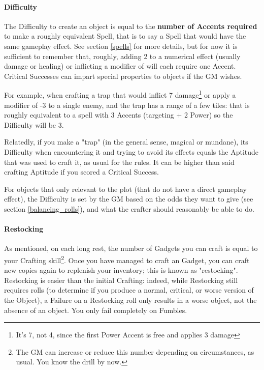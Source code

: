 \paragraph{Difficulty}

The Difficulty to create an object is equal to the \textbf{number of Accents required} to make a roughly equivalent Spell, that is to say a Spell that would have the same gameplay effect. See section \ref{spells} for more details, but for now it is sufficient to remember that, roughly, adding 2 to a numerical effect (usually damage or healing) or inflicting a modifier of  will each require one Accent. Critical Successes can impart special properties to objects if the GM wishes.

For example, when crafting a trap that would inflict 7 damage\footnote{It's 7, not 4, since the first Power Accent is free and applies 3 damage} or apply a modifier of -3 to a single enemy, and the trap has a range of a few tiles: that is roughly equivalent to a spell with 3 Accents (targeting + 2 Power) so the Difficulty will be 3.

Relatedly, if you make a "trap" (in the general sense, magical or mundane), its Difficulty when encountering it and trying to avoid its effects equals the Aptitude that was used to craft it, as usual for the rules. It can be higher than said crafting Aptitude if you scored a Critical Success.

For objects that only relevant to the plot (that do not have a direct gameplay effect), the Difficulty is set by the GM based on the odds they want to give (see section \ref{balancing_rolls}), and what the crafter should reasonably be able to do.

\paragraph{Restocking}

As mentioned, on each long rest, the number of Gadgets you can craft is equal to your Crafting skill\footnote{The GM can increase or reduce this number depending on circumstances, as usual. You know the drill by now.}. Once you have managed to craft an Gadget, you can craft new copies again to replenish your inventory; this is known as "restocking". Restocking is easier than the initial Crafting: indeed, while Restocking still requires rolls (to determine if you produce a normal, critical, or worse version of the Object), a Failure on a Restocking roll only results in a worse object, not the absence of an object. You only fail completely on Fumbles.

